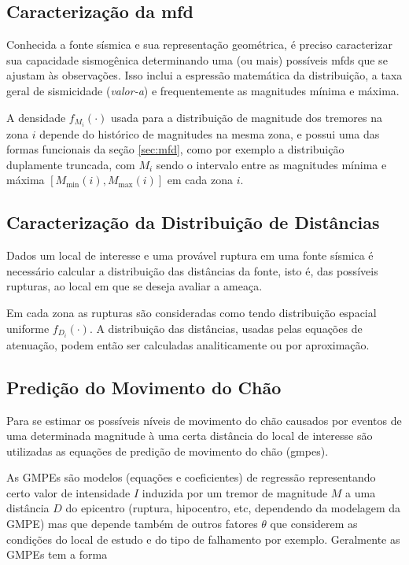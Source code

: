 \subsection{Caracterização da \glsdesc*{mfd}}
\label{sec:psha_mfd}

Conhecida a fonte sísmica e sua representação geométrica, é preciso caracterizar sua capacidade sismogênica determinando
uma (ou mais) possíveis \gls{mfd}s que se ajustam às observações. Isso inclui a espressão matemática da distribuição, a
taxa geral de sismicidade (\emph{valor-a}) e frequentemente as magnitudes mínima e máxima.


A densidade $f_{M_i}(\cdot)$ usada para a distribuição de magnitude dos tremores na zona $i$ depende do
histórico de magnitudes na mesma zona, e possui uma das formas funcionais da seção \ref{sec:mfd},
como por exemplo a distribuição duplamente truncada,
com $M_i$ sendo o intervalo entre as magnitudes mínima e máxima $[M_{\min}(i), M_{\max}(i)]$
em cada zona $i$.


\subsection{Caracterização da Distribuição de Distâncias}
\label{sec:psha_distances}

Dados um local de interesse e uma provável ruptura em uma fonte sísmica é necessário calcular a distribuição das
distâncias da fonte, isto é, das possíveis rupturas, ao local em que se deseja avaliar a ameaça.

Em cada zona as rupturas são consideradas como tendo distribuição espacial uniforme $f_{D_i}(\cdot)$.
A distribuição das distâncias, usadas pelas equações de atenuação, podem então ser calculadas
analiticamente ou por aproximação.


\subsection{Predição do Movimento do Chão}
\label{sec:gmpe}

Para se estimar os possíveis níveis de movimento do chão causados por eventos de uma determinada magnitude à uma certa
distância do local de interesse são utilizadas as equações de predição de movimento do chão (\glspl{gmpe}).

As GMPEs são modelos (equações e coeficientes) de regressão representando certo valor de
intensidade $I$ induzida por um tremor de magnitude $M$ a uma distância $D$ do epicentro (ruptura, hipocentro, etc, dependendo da
modelagem da GMPE) mas que depende também de outros fatores $\theta$ que considerem as condições
do local de estudo e do tipo de falhamento por exemplo. Geralmente as GMPEs tem a forma

